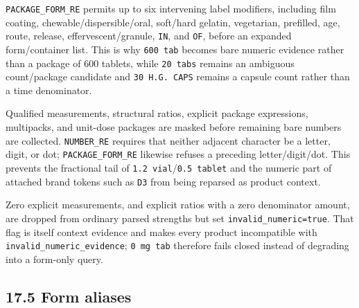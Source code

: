 \texttt{PACKAGE\_\allowbreak{}FORM\_\allowbreak{}RE} permits up to six intervening label modifiers, including film coating, chewable/dispersible/oral, soft/hard gelatin, vegetarian, prefilled, age, route, release, effervescent/granule, \texttt{IN}, and \texttt{OF}, before an expanded form/container list. This is why \texttt{600\ tab} becomes bare numeric evidence rather than a package of 600 tablets, while \texttt{20\ tabs} remains an ambiguous count/package candidate and \texttt{30\ H.G.\ CAPS} remains a capsule count rather than a time denominator.

Qualified measurements, structural ratios, explicit package expressions, multipacks, and unit-dose packages are masked before remaining bare numbers are collected. \texttt{NUMBER\_\allowbreak{}RE} requires that neither adjacent character be a letter, digit, or dot; \texttt{PACKAGE\_\allowbreak{}FORM\_\allowbreak{}RE} likewise refuses a preceding letter/digit/dot. This prevents the fractional tail of \texttt{1.2\ vial}/\texttt{0.5\ tablet} and the numeric part of attached brand tokens such as \texttt{D3} from being reparsed as product context.

Zero explicit measurements, and explicit ratios with a zero denominator amount, are dropped from ordinary parsed strengths but set \texttt{invalid\_\allowbreak{}numeric=true}. That flag is itself context evidence and makes every product incompatible with \texttt{invalid\_\allowbreak{}numeric\_\allowbreak{}evidence}; \texttt{0\ mg\ tab} therefore fails closed instead of degrading into a form-only query.

\subsection{17.5 Form aliases}\label{175-form-aliases}

